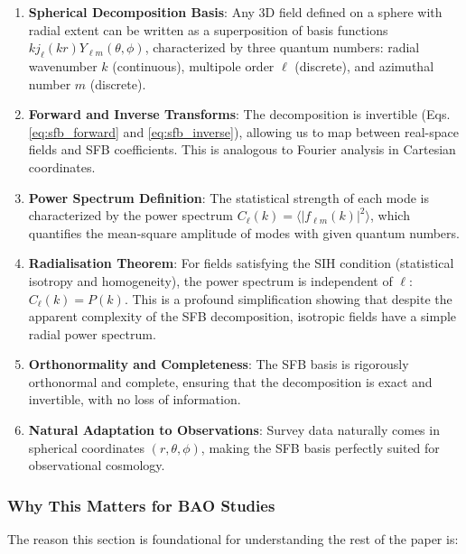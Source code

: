 \begin{enumerate}
    \item \textbf{Spherical Decomposition Basis}: Any 3D field defined on a sphere with radial extent can be written as a superposition of basis functions $k j_\ell(kr) Y_{\ell m}(\theta, \phi)$, characterized by three quantum numbers: radial wavenumber $k$ (continuous), multipole order $\ell$ (discrete), and azimuthal number $m$ (discrete).
    
    \item \textbf{Forward and Inverse Transforms}: The decomposition is invertible (Eqs. \eqref{eq:sfb_forward} and \eqref{eq:sfb_inverse}), allowing us to map between real-space fields and SFB coefficients. This is analogous to Fourier analysis in Cartesian coordinates.
    
    \item \textbf{Power Spectrum Definition}: The statistical strength of each mode is characterized by the power spectrum $C_\ell(k) = \langle |f_{\ell m}(k)|^2 \rangle$, which quantifies the mean-square amplitude of modes with given quantum numbers.
    
    \item \textbf{Radialisation Theorem}: For fields satisfying the SIH condition (statistical isotropy and homogeneity), the power spectrum is independent of $\ell$: $C_\ell(k) = P(k)$. This is a profound simplification showing that despite the apparent complexity of the SFB decomposition, isotropic fields have a simple radial power spectrum.
    
    \item \textbf{Orthonormality and Completeness}: The SFB basis is rigorously orthonormal and complete, ensuring that the decomposition is exact and invertible, with no loss of information.
    
    \item \textbf{Natural Adaptation to Observations}: Survey data naturally comes in spherical coordinates $(r, \theta, \phi)$, making the SFB basis perfectly suited for observational cosmology.
\end{enumerate}

\subsubsection{Why This Matters for BAO Studies}

The reason this section is foundational for understanding the rest of the paper is:

